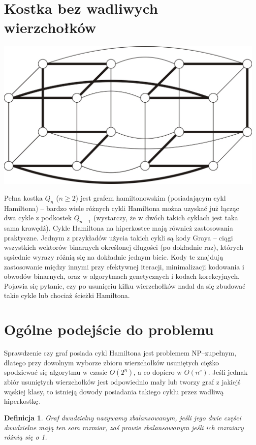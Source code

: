 \documentclass{pracamgr}
\newtheorem{defi}[theorem]{Definicja}
\begin{document}
  \section{Kostka bez wadliwych wierzchołków}
   \begin{center}
    \includegraphics[scale=0.5]{img/Q4_hamilton.jpg}
   \end{center}
   Pełna kostka $Q_n$ ($n\ge2$) jest grafem hamiltonowskim (posiadającym cykl Hamiltona)
   -- bardzo wiele różnych cykli Hamiltona można uzyskać już łącząc dwa cykle
   z podkostek $Q_{n-1}$ (wystarczy, że w dwóch takich cyklach jest taka sama krawędź).
   Cykle Hamiltona na hiperkostce mają również zastosowania praktyczne. Jednym z przykładów użycia takich cykli są kody Graya
   -- ciągi wszystkich wektorów binarnych określonej długości (po dokładnie raz), których sąsiednie wyrazy różnią się na dokładnie jednym bicie.
   Kody te znajdują zastosowanie między innymi przy efektywnej iteracji, minimalizacji kodowania i obwodów binarnych,
   oraz w algorytmach genetycznych i kodach korekcyjnych.\newline
   Pojawia się pytanie, czy po usunięciu kilku wierzchołków nadal da się zbudować takie cykle lub chociaż ścieżki Hamiltona.
  \section{Ogólne podejście do problemu}
   Sprawdzenie czy graf posiada cykl Hamiltona jest problemem NP--zupełnym, dlatego przy dowolnym wyborze zbioru wierzchołków usuniętych
   ciężko spodziewać się algorytmu w czasie $O(2^n)$, a co dopiero w $O(n^c)$. Jeśli jednak zbiór usuniętych wierzchołków
   jest odpowiednio mały lub tworzy graf z jakiejś wąskiej klasy, to istnieją dowody posiadania takiego cyklu przez wadliwą hiperkostkę.
   \begin{defi}\label{graf zbalansowany}
    Graf dwudzielny nazywamy \emph{zbalansowanym}, jeśli jego dwie części dwudzielne mają ten sam rozmiar,
    zaś \emph{prawie zbalansowanym} jeśli ich rozmiary różnią się o 1.
   \end{defi}    
   
\end{document}
